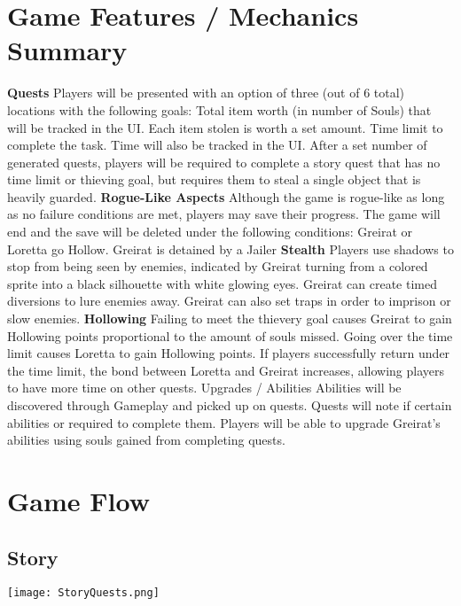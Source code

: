 \documentclass[11pt,fleqn]{book} %
\begin{document}
\section{Game Features / Mechanics Summary}

\begin{outline}
	\1 \textbf{Quests}
		\2 Players will be presented with an option of three (out of 6 total) locations with the following goals:
			\3 Total item worth (in number of Souls) that will be tracked in the UI. Each item stolen is worth a set amount.
			\3 Time limit to complete the task. Time will also be tracked in the UI.
		\2 After a set number of generated quests, players will be required to complete a story quest that has no time limit or thieving goal, but requires them to steal a single object that is heavily guarded.
	\1 \textbf{Rogue-Like Aspects}
		\2 Although the game is rogue-like as long as no failure conditions are met, players may save their progress.
		\2 The game will end and the save will be deleted under the following conditions:
			\3 Greirat or Loretta go Hollow.
			\3 Greirat is detained by a Jailer
	\1 \textbf{Stealth}
		\2 Players use shadows to stop from being seen by enemies, indicated by Greirat turning from a colored sprite into a black silhouette with white glowing eyes.
		\2 Greirat can create timed diversions to lure enemies away.
		\2 Greirat can also set traps in order to imprison or slow enemies.
	\1 \textbf{Hollowing}
		\2 Failing to meet the thievery goal causes Greirat to gain Hollowing points proportional to the amount of souls missed.
		\2 Going over the time limit causes Loretta to gain Hollowing points. If players successfully return under the time limit, the bond between Loretta and Greirat increases, allowing players to have more time on other quests.
	\1 Upgrades / Abilities
		\2 Abilities will be discovered through Gameplay and picked up on quests. Quests will note if certain abilities or required to complete them.
		\2 Players will be able to upgrade Greirat's abilities using souls gained from completing quests.
\end{outline}
\vspace{-\baselineskip}

\section{Game Flow}
	\subsection{Story}
		\texttt{[image: StoryQuests.png]}
\end{document}
